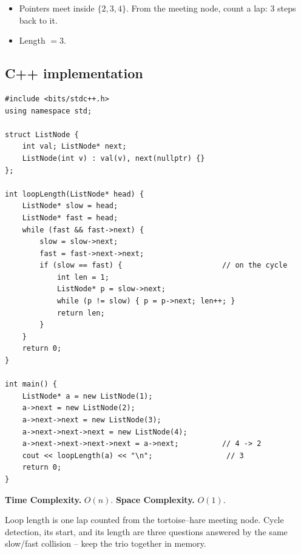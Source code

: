
\begin{itemize}
  \item Pointers meet inside $\{2,3,4\}$. From the meeting node, count a
        lap: $3$ steps back to it.
  \item Length $=3$.
\end{itemize}

\subsection*{C++ implementation}

\begin{lstlisting}
#include <bits/stdc++.h>
using namespace std;

struct ListNode {
    int val; ListNode* next;
    ListNode(int v) : val(v), next(nullptr) {}
};

int loopLength(ListNode* head) {
    ListNode* slow = head;
    ListNode* fast = head;
    while (fast && fast->next) {
        slow = slow->next;
        fast = fast->next->next;
        if (slow == fast) {                       // on the cycle
            int len = 1;
            ListNode* p = slow->next;
            while (p != slow) { p = p->next; len++; }
            return len;
        }
    }
    return 0;
}

int main() {
    ListNode* a = new ListNode(1);
    a->next = new ListNode(2);
    a->next->next = new ListNode(3);
    a->next->next->next = new ListNode(4);
    a->next->next->next->next = a->next;          // 4 -> 2
    cout << loopLength(a) << "\n";                 // 3
    return 0;
}
\end{lstlisting}

\begin{complexitybox}
\textbf{Time Complexity.} $O(n)$. \textbf{Space Complexity.} $O(1)$.
\end{complexitybox}

\begin{takeawaybox}
Loop length is one lap counted from the tortoise--hare meeting node. Cycle
detection, its start, and its length are three questions answered by the
same slow/fast collision -- keep the trio together in memory.
\end{takeawaybox}
